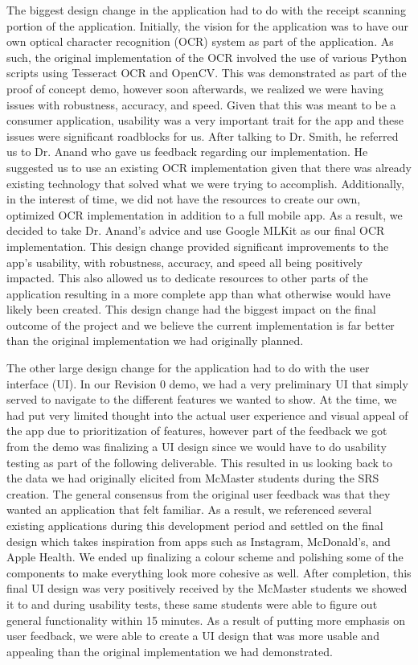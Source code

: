 \documentclass{article}
\begin{document}
The biggest design change in the application had to do with the receipt scanning portion of the
application. Initially, the vision for the application was to have our own optical character recognition (OCR)
system as part of the application. As such, the original implementation of the OCR involved the use
of various Python scripts using Tesseract OCR and OpenCV. This was demonstrated as part of the proof of concept demo,
however soon afterwards, we realized we were having issues with robustness, accuracy, and speed. Given that this
was meant to be a consumer application, usability was a very important trait for the app and these issues
were significant roadblocks for us. After talking to Dr. Smith, he referred us to Dr. Anand who gave us
feedback regarding our implementation. He suggested us to use an existing OCR implementation given
that there was already existing technology that solved what we were trying to accomplish. Additionally, in the interest of time,
we did not have the resources to create our own, optimized OCR implementation in addition to a full
mobile app. As a result, we decided to take Dr. Anand's advice and use Google MLKit as our final OCR implementation. This
design change provided significant improvements to the app's usability, with robustness, accuracy, and speed all being
positively impacted. This also allowed us to dedicate resources to other parts of the application resulting in a
more complete app than what otherwise would have likely been created. This design change had the biggest impact on
the final outcome of the project and we believe the current implementation is far better than the original implementation
we had originally planned.

The other large design change for the application had to do with the user interface (UI). In our Revision 0 demo,
we had a very preliminary UI that simply served to navigate to the different features we wanted to show. At the time,
we had put very limited thought into the actual user experience and visual appeal of the app due to prioritization of
features, however part of the feedback we got from the demo was finalizing a UI design since we would have to do
usability testing as part of the following deliverable. This resulted in us looking back to the data we had originally
elicited from McMaster students during the SRS creation. The general consensus from the original user feedback was that
they wanted an application that felt familiar. As a result, we referenced several existing applications during this development
period and settled on the final design which takes inspiration from apps such as Instagram, McDonald's, and Apple Health. We ended
up finalizing a colour scheme and polishing some of the components to make everything look more cohesive as well. After
completion, this final UI design was very positively received by the McMaster students we showed it to and during usability tests, 
these same students were able to figure out general functionality within 15 minutes. As a result of putting more emphasis on
user feedback, we were able to create a UI design that was more usable and appealing than the original implementation we had
demonstrated.
\end{document}
